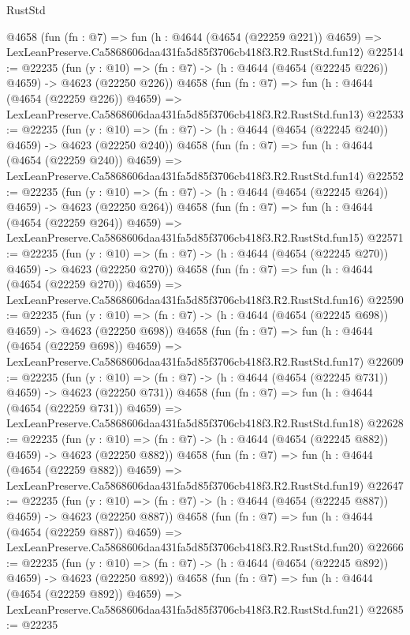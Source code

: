 \begin{lexlean}{RustStd}
\begin{coremodule}
    @4658
    (fun (fn : @7) =>
    fun (h : @4644 (@4654 (@22259 @221)) @4659) =>
    LexLeanPreserve.Ca5868606daa431fa5d85f3706cb418f3.R2.RustStd.fun12)
@22514 := @22235
    (fun (y : @10) => (fn : @7) -> (h : @4644 (@4654 (@22245 @226)) @4659) -> @4623 (@22250 @226))
    @4658
    (fun (fn : @7) =>
    fun (h : @4644 (@4654 (@22259 @226)) @4659) =>
    LexLeanPreserve.Ca5868606daa431fa5d85f3706cb418f3.R2.RustStd.fun13)
@22533 := @22235
    (fun (y : @10) => (fn : @7) -> (h : @4644 (@4654 (@22245 @240)) @4659) -> @4623 (@22250 @240))
    @4658
    (fun (fn : @7) =>
    fun (h : @4644 (@4654 (@22259 @240)) @4659) =>
    LexLeanPreserve.Ca5868606daa431fa5d85f3706cb418f3.R2.RustStd.fun14)
@22552 := @22235
    (fun (y : @10) => (fn : @7) -> (h : @4644 (@4654 (@22245 @264)) @4659) -> @4623 (@22250 @264))
    @4658
    (fun (fn : @7) =>
    fun (h : @4644 (@4654 (@22259 @264)) @4659) =>
    LexLeanPreserve.Ca5868606daa431fa5d85f3706cb418f3.R2.RustStd.fun15)
@22571 := @22235
    (fun (y : @10) => (fn : @7) -> (h : @4644 (@4654 (@22245 @270)) @4659) -> @4623 (@22250 @270))
    @4658
    (fun (fn : @7) =>
    fun (h : @4644 (@4654 (@22259 @270)) @4659) =>
    LexLeanPreserve.Ca5868606daa431fa5d85f3706cb418f3.R2.RustStd.fun16)
@22590 := @22235
    (fun (y : @10) => (fn : @7) -> (h : @4644 (@4654 (@22245 @698)) @4659) -> @4623 (@22250 @698))
    @4658
    (fun (fn : @7) =>
    fun (h : @4644 (@4654 (@22259 @698)) @4659) =>
    LexLeanPreserve.Ca5868606daa431fa5d85f3706cb418f3.R2.RustStd.fun17)
@22609 := @22235
    (fun (y : @10) => (fn : @7) -> (h : @4644 (@4654 (@22245 @731)) @4659) -> @4623 (@22250 @731))
    @4658
    (fun (fn : @7) =>
    fun (h : @4644 (@4654 (@22259 @731)) @4659) =>
    LexLeanPreserve.Ca5868606daa431fa5d85f3706cb418f3.R2.RustStd.fun18)
@22628 := @22235
    (fun (y : @10) => (fn : @7) -> (h : @4644 (@4654 (@22245 @882)) @4659) -> @4623 (@22250 @882))
    @4658
    (fun (fn : @7) =>
    fun (h : @4644 (@4654 (@22259 @882)) @4659) =>
    LexLeanPreserve.Ca5868606daa431fa5d85f3706cb418f3.R2.RustStd.fun19)
@22647 := @22235
    (fun (y : @10) => (fn : @7) -> (h : @4644 (@4654 (@22245 @887)) @4659) -> @4623 (@22250 @887))
    @4658
    (fun (fn : @7) =>
    fun (h : @4644 (@4654 (@22259 @887)) @4659) =>
    LexLeanPreserve.Ca5868606daa431fa5d85f3706cb418f3.R2.RustStd.fun20)
@22666 := @22235
    (fun (y : @10) => (fn : @7) -> (h : @4644 (@4654 (@22245 @892)) @4659) -> @4623 (@22250 @892))
    @4658
    (fun (fn : @7) =>
    fun (h : @4644 (@4654 (@22259 @892)) @4659) =>
    LexLeanPreserve.Ca5868606daa431fa5d85f3706cb418f3.R2.RustStd.fun21)
@22685 := @22235

\end{coremodule}
\end{lexlean}
